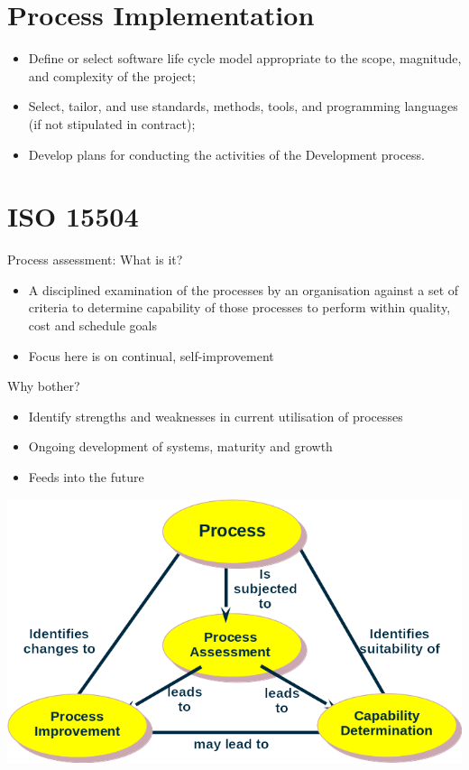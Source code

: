 \documentclass{article}[18pt]
\begin{document}
\section{Process Implementation}
\begin{itemize}
	\item Define or select software life cycle model appropriate to the scope, magnitude, and complexity of the project;
	\item Select, tailor, and use standards, methods, tools, and programming languages (if not stipulated in  contract);
	\item Develop plans for conducting the activities of the Development process.
\end{itemize}
\section{ISO 15504}
Process assessment: What is it?
\begin{itemize}
	\item A disciplined examination of the processes by an organisation against a set of criteria to determine capability of those processes to perform within quality, cost and schedule goals
	\item Focus here is on continual, self-improvement
\end{itemize}
Why bother?
\begin{itemize}
	\item Identify strengths and weaknesses in current utilisation of processes
	\item Ongoing development of systems, maturity and growth
	\item Feeds into the future
\end{itemize}
\begin{center}
	\includegraphics[scale=0.7]{ISO15504}
\end{center}
\end{document}
